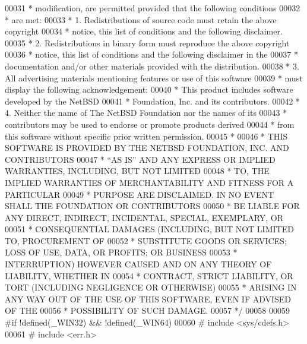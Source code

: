 \begin{DoxyCode}
00031 \textcolor{comment}{ * modification, are permitted provided that the following conditions}
00032 \textcolor{comment}{ * are met:}
00033 \textcolor{comment}{ * 1. Redistributions of source code must retain the above copyright}
00034 \textcolor{comment}{ *    notice, this list of conditions and the following disclaimer.}
00035 \textcolor{comment}{ * 2. Redistributions in binary form must reproduce the above copyright}
00036 \textcolor{comment}{ *    notice, this list of conditions and the following disclaimer in the}
00037 \textcolor{comment}{ *    documentation and/or other materials provided with the distribution.}
00038 \textcolor{comment}{ * 3. All advertising materials mentioning features or use of this software}
00039 \textcolor{comment}{ *    must display the following acknowledgement:}
00040 \textcolor{comment}{ *        This product includes software developed by the NetBSD}
00041 \textcolor{comment}{ *        Foundation, Inc. and its contributors.}
00042 \textcolor{comment}{ * 4. Neither the name of The NetBSD Foundation nor the names of its}
00043 \textcolor{comment}{ *    contributors may be used to endorse or promote products derived}
00044 \textcolor{comment}{ *    from this software without specific prior written permission.}
00045 \textcolor{comment}{ *}
00046 \textcolor{comment}{ * THIS SOFTWARE IS PROVIDED BY THE NETBSD FOUNDATION, INC. AND CONTRIBUTORS}
00047 \textcolor{comment}{ * ``AS IS'' AND ANY EXPRESS OR IMPLIED WARRANTIES, INCLUDING, BUT NOT LIMITED}
00048 \textcolor{comment}{ * TO, THE IMPLIED WARRANTIES OF MERCHANTABILITY AND FITNESS FOR A PARTICULAR}
00049 \textcolor{comment}{ * PURPOSE ARE DISCLAIMED.  IN NO EVENT SHALL THE FOUNDATION OR CONTRIBUTORS}
00050 \textcolor{comment}{ * BE LIABLE FOR ANY DIRECT, INDIRECT, INCIDENTAL, SPECIAL, EXEMPLARY, OR}
00051 \textcolor{comment}{ * CONSEQUENTIAL DAMAGES (INCLUDING, BUT NOT LIMITED TO, PROCUREMENT OF}
00052 \textcolor{comment}{ * SUBSTITUTE GOODS OR SERVICES; LOSS OF USE, DATA, OR PROFITS; OR BUSINESS}
00053 \textcolor{comment}{ * INTERRUPTION) HOWEVER CAUSED AND ON ANY THEORY OF LIABILITY, WHETHER IN}
00054 \textcolor{comment}{ * CONTRACT, STRICT LIABILITY, OR TORT (INCLUDING NEGLIGENCE OR OTHERWISE)}
00055 \textcolor{comment}{ * ARISING IN ANY WAY OUT OF THE USE OF THIS SOFTWARE, EVEN IF ADVISED OF THE}
00056 \textcolor{comment}{ * POSSIBILITY OF SUCH DAMAGE.}
00057 \textcolor{comment}{ */}
00058 
00059 \textcolor{preprocessor}{#if !defined(\_WIN32) && !defined(\_WIN64)}
00060 \textcolor{preprocessor}{#   include <sys/cdefs.h>}
00061 \textcolor{preprocessor}{#   include <err.h>}

\end{DoxyCode}
